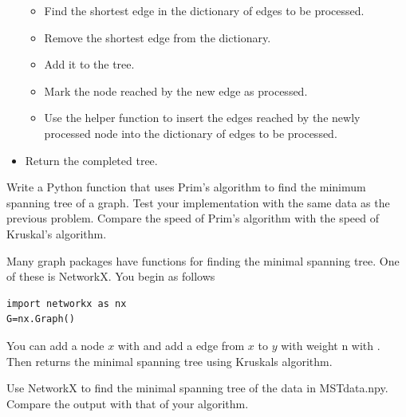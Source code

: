 \begin{itemize}
	\begin{itemize}

	\item Find the shortest edge in the dictionary of edges to be processed.

	\item Remove the shortest edge from the dictionary.

	\item Add it to the tree.

	\item Mark the node reached by the new edge as processed.

	\item Use the helper function to insert the edges reached by the newly processed node into the dictionary of edges to be processed.

	\end{itemize}

\item Return the completed tree.

\end{itemize}

\begin{problem}
Write a Python function that uses Prim's algorithm to find the minimum spanning tree of a graph.
Test your implementation with the same data as the previous problem.
Compare the speed of Prim's algorithm with the speed of Kruskal's algorithm.
\end{problem}

Many graph packages have functions for finding the minimal spanning tree. One of these is NetworkX. You begin as follows
\begin{lstlisting}
import networkx as nx
G=nx.Graph()
\end{lstlisting}
You can add a node $x$ with  and add a edge from $x$ to $y$ with weight n with . Then  returns the minimal spanning tree using Kruskals algorithm.

\begin{problem}
Use NetworkX to find the minimal spanning tree of the data in MSTdata.npy. Compare the output with that of your algorithm.
\end{problem}